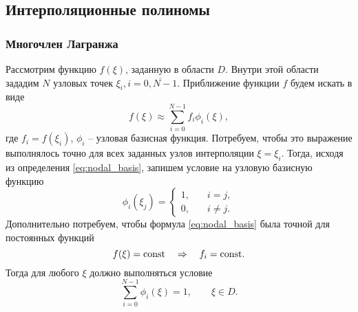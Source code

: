 \subsection{Интерполяционные полиномы}

\subsubsection{Многочлен Лагранжа}


Рассмотрим функцию $f(\xi)$, заданную в области $D$.
Внутри этой области зададим $N$ узловых
точек $\xi_i, i=\overline{0,N-1}$.
Приближение функции $f$ будем искать в виде
\begin{equation}
\label{eq:nodal_basis}
f(\xi) \approx \sum_{i=0}^{N-1} f_i \phi_i(\xi),
\end{equation}
где  $f_i = f(\xi_i)$, $\phi_i$ -- узловая базисная функция.
Потребуем, чтобы это выражение выполнялось точно для всех
заданных узлов интерполяции $\xi = \xi_i$. Тогда, исходя из определения \cref{eq:nodal_basis}, запишем условие 
на узловую базисную функцию
\begin{equation}
\label{eq:nodal_bases_conditions}
\phi_i(\xi_j) = 
\begin{cases}
1, &\quad i = j, \\
0, &\quad i \neq j.
\end{cases}
\end{equation}
Дополнительно потребуем, чтобы формула \cref{eq:nodal_basis} была
точной для постоянных функций
$$
f(\xi)={\rm const} \quad\Rightarrow\quad f_i = {\rm const}.
$$
Тогда для любого $\xi$ должно выполняться условие
\begin{equation}
\label{eq:nodal_bases_unitsum}
\sum_{i=0}^{N-1} \phi_i(\xi) = 1, \qquad \xi \in D.
\end{equation}

